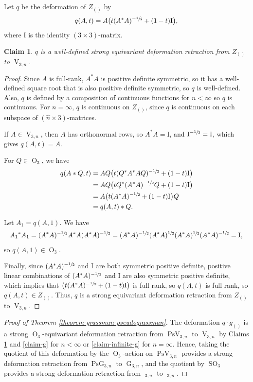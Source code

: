 \documentclass[JEP,XML,SOM,Unicode,NoFloatCountersInSection,published]{cedram}
\let\nicefrac\sfrac
\newtheorem{claim}[theorem]{Claim}
\theoremstyle{remark}
\DeclareMathOperator{\pg}{PsG}
\DeclareMathOperator{\pog}{Ps\widetilde G}
\DeclareMathOperator{\g}{G}
\DeclareMathOperator{\oG}{\widetilde G}
\DeclareMathOperator{\orth}{O}
\DeclareMathOperator{\sorth}{SO}
\DeclareMathOperator{\stief}{V}
\DeclareMathOperator{\pstief}{PsV}
\begin{document}
\newcommand{\I}{\text{I}}

Let $q$ be the deformation of $Z_{()}$ by\vspace*{-3pt}
\[ q(A,t) = A \bigl(t(A^*A)^{-\nicefrac{1}{2}}+(1-t)\I\bigr), \]
where $\I$ is the identity $(3\times 3)$-matrix.

\begin{claim}\label{claim-orthonormalization}
$q$ is a well-defined strong equivariant deformation retraction from $Z_{()}$ to $\stief_{3,n}$.
\end{claim}

\begin{proof}
Since $A$ is full-rank, $A^*A$ is positive definite symmetric, so it has a well-defined square root that is also positive definite symmetric, so $q$ is well-defined. Also, $q$ is defined by a composition of continuous functions for $n < \infty$ so $q$ is continuous. For $n=\infty$, $q$ is continuous on $Z_{()}$, since $q$ is continuous on each subspace of $(\hat n\times 3)$-matrices.

If $A \in \stief_{3,n}$, then $A$ has orthonormal rows, so $A^*A = \I$, and $\I^{-\nicefrac{1}{2}} = \I$, which gives $q(A,t) = A$.

For $Q \in \orth_3$, we have\vspace*{-3pt}
\begin{align*}
q(A*Q,t)&= AQ \bigl(t(Q^*A^*AQ)^{-\nicefrac{1}{2}}+(1-t)\I \bigr) \\
&= AQ \bigl(tQ^*(A^*A)^{-\nicefrac{1}{2}}Q+(1-t)\I \bigr) \\
&= A \bigl(t(A^*A)^{-\nicefrac{1}{2}}+(1-t)\I \bigr) Q \\
&= q(A,t)*Q.
\end{align*}

Let $A_1 = q(A,1)$. We have
\[ A_1{}^* A_1
= (A^*A)^{-\nicefrac{1}{2}} A^* A (A^*A)^{-\nicefrac{1}{2}}
= (A^*A)^{-\nicefrac{1}{2}} (A^* A)^{\nicefrac{1}{2}} (A^* A)^{\nicefrac{1}{2}} (A^*A)^{-\nicefrac{1}{2}}
= \I, \]
so $q(A,1) \in \orth_3$.

Finally, since $(A^*A)^{-\nicefrac{1}{2}}$ and $\I$ are both symmetric positive definite, positive linear combinations of $(A^*A)^{-\nicefrac{1}{2}}$ and $\I$ are also symmetric positive definite, which implies that $\left(t(A^*A)^{-\nicefrac{1}{2}}+(1-t)\I\right)$ is full-rank, so $q(A,t)$ is full-rank, so $q(A,t) \in Z_{()}$.
Thus, $q$ is a strong equivariant deformation retraction from $Z_{()}$ to $\stief_{3,n}$.
\end{proof}

\begin{proof}[Proof of Theorem \ref{theorem-grassman-pseudograssman}]
The deformation $q \cdot g_{()}$ is a strong $\orth_3$-equivariant deformation retraction from $\pstief_{3,n}$ to $\stief_{3,n}$ by Claims \ref{claim-orthonormalization} and \ref{claim-g} for $n < \infty$ or \ref{claim-infinite-g} for $n = \infty$.
Hence, taking the quotient of this deformation by the $\orth_3$-action on $\pstief_{3,n}$ provides a strong deformation retraction from $\pg_{3,n}$ to $\g_{3,n}$, and the quotient by $\sorth_3$ provides a strong deformation retraction from $\pog_{3,n}$ to $\oG_{3,n}$.
\end{proof}
\end{document}
